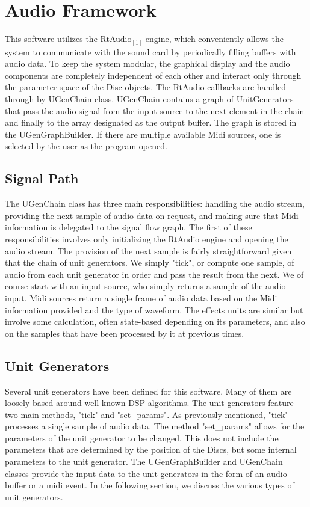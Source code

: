 \documentclass[pdftext,twoside,10pt]{article}
\begin{document}
\section{Audio Framework}

This software utilizes the RtAudio$_{[1]}$ engine, which conveniently allows the system to communicate with the sound card by periodically filling buffers with audio data. To keep the system modular, the graphical display and the audio components are completely independent of each other and interact only through the parameter space of the Disc objects. The RtAudio callbacks are handled through by UGenChain class. UGenChain contains a graph of UnitGenerators that pass the audio signal from the input source to the next element in the chain and finally to the array designated as the output buffer. The graph is stored in the UGenGraphBuilder. If there are multiple available Midi sources, one is selected by the user as the program opened.

\subsection{Signal Path}
The UGenChain class has three main responsibilities: handling the audio stream, providing the next sample of audio data on request, and making sure that Midi information is delegated to the signal flow graph. The first of these responsibilities involves only initializing the RtAudio engine and opening the audio stream. The provision of the next sample is fairly straightforward given that the chain of unit generators. We simply "tick", or compute one sample, of audio from each unit generator in order and pass the result from the next. We of course start with an input source, who simply returns a sample of the audio input. Midi sources return a single frame of audio data based on the Midi information provided and the type of waveform. The effects units are similar but involve some calculation, often state-based depending on its parameters, and also on the samples that have been processed by it at previous times.

\subsection{Unit Generators}
Several unit generators have been defined for this software. Many of them are loosely based around well known DSP algorithms. The unit generators feature two main methods, "tick" and "set\_params". As previously mentioned, "tick" processes a single sample of audio data. The method "set\_params" allows for the parameters of the unit generator to be changed. This does not include the parameters that are determined by the position of the Discs, but some internal parameters to the unit generator. The UGenGraphBuilder and UGenChain classes provide the input data to the unit generators in the form of an audio buffer or a midi event. In the following section, we discuss the various types of unit generators.
\end{document}
